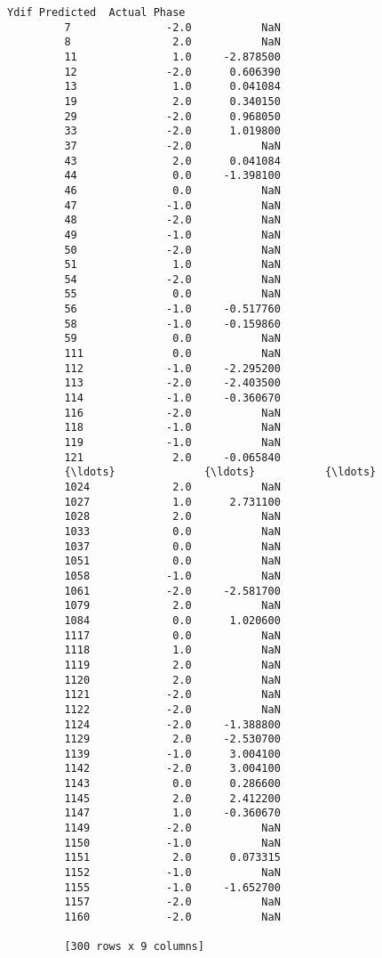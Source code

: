 \documentclass[11pt]{article}
\begin{document}
\begin{Verbatim}[commandchars=\\\{\}]
               Ydif Predicted  Actual Phase  
         7               -2.0           NaN  
         8                2.0           NaN  
         11               1.0     -2.878500  
         12              -2.0      0.606390  
         13               1.0      0.041084  
         19               2.0      0.340150  
         29              -2.0      0.968050  
         33              -2.0      1.019800  
         37              -2.0           NaN  
         43               2.0      0.041084  
         44               0.0     -1.398100  
         46               0.0           NaN  
         47              -1.0           NaN  
         48              -2.0           NaN  
         49              -1.0           NaN  
         50              -2.0           NaN  
         51               1.0           NaN  
         54              -2.0           NaN  
         55               0.0           NaN  
         56              -1.0     -0.517760  
         58              -1.0     -0.159860  
         59               0.0           NaN  
         111              0.0           NaN  
         112             -1.0     -2.295200  
         113             -2.0     -2.403500  
         114             -1.0     -0.360670  
         116             -2.0           NaN  
         118             -1.0           NaN  
         119             -1.0           NaN  
         121              2.0     -0.065840  
         {\ldots}              {\ldots}           {\ldots}  
         1024             2.0           NaN  
         1027             1.0      2.731100  
         1028             2.0           NaN  
         1033             0.0           NaN  
         1037             0.0           NaN  
         1051             0.0           NaN  
         1058            -1.0           NaN  
         1061            -2.0     -2.581700  
         1079             2.0           NaN  
         1084             0.0      1.020600  
         1117             0.0           NaN  
         1118             1.0           NaN  
         1119             2.0           NaN  
         1120             2.0           NaN  
         1121            -2.0           NaN  
         1122            -2.0           NaN  
         1124            -2.0     -1.388800  
         1129             2.0     -2.530700  
         1139            -1.0      3.004100  
         1142            -2.0      3.004100  
         1143             0.0      0.286600  
         1145             2.0      2.412200  
         1147             1.0     -0.360670  
         1149            -2.0           NaN  
         1150            -1.0           NaN  
         1151             2.0      0.073315  
         1152            -1.0           NaN  
         1155            -1.0     -1.652700  
         1157            -2.0           NaN  
         1160            -2.0           NaN  
         
         [300 rows x 9 columns]
\end{Verbatim}
            
\end{document}

